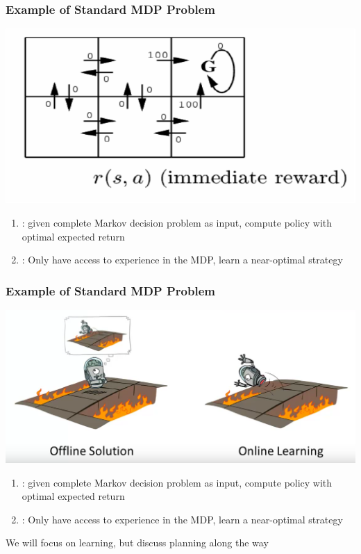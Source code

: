 \documentclass[handout]{beamer}
\begin{document}
\begin{frame}\frametitle{Example of Standard MDP Problem}\small
\begin{center}
\includegraphics[width=0.54\linewidth]{Figures/tic_tac_rl} 
\end{center}
\begin{enumerate}
\item  {}: given complete Markov decision problem as input, compute policy with optimal expected return
\item {}: Only have access to experience in the MDP, learn a near-optimal strategy
\end{enumerate}
\end{frame}

\begin{frame}\frametitle{Example of Standard MDP Problem}\small
\begin{center}
\includegraphics[width=0.785\linewidth,trim=0 50 0 0,clip]{Figures/rll4} 
\end{center}
\begin{enumerate}
\item  {}: given complete Markov decision problem as input, compute policy with optimal expected return
\item {}: Only have access to experience in the MDP, learn a near-optimal strategy
\end{enumerate}
We will focus on learning, but discuss planning along the way
\end{frame}
\end{document}
